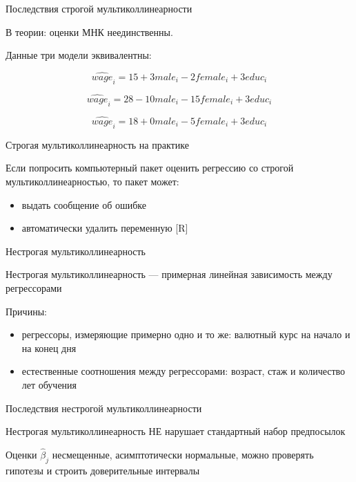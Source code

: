 \documentclass[ignorenonframetext,]{beamer}
\begin{document}
\begin{frame}{Последствия строгой мультиколлинеарности}

В теории: оценки МНК неединственны.

Данные три модели эквивалентны:

\[
\widehat{wage}_i=15 + 3 male_i -2 female_i + 3 educ_i 
\]

\[
\widehat{wage}_i=28 -10 male_i -15 female_i + 3 educ_i 
\]

\[
\widehat{wage}_i=18 + 0 male_i -5 female_i + 3 educ_i 
\]

\end{frame}

\begin{frame}{Строгая мультиколлинеарность на практике}

Если попросить компьютерный пакет оценить регрессию со строгой
мультиколлинеарностью, то пакет может:

\begin{itemize}
\itemsep1pt\parskip0pt
\item
  выдать сообщение об ошибке
\item
  автоматически удалить переменную {[}R{]}
\end{itemize}

\end{frame}

\begin{frame}{Нестрогая мультиколлинеарность}

Нестрогая мультиколлинеарность --- примерная линейная зависимость между
регрессорами

Причины:

\begin{itemize}
\itemsep1pt\parskip0pt
\item
  регрессоры, измеряющие примерно одно и то же: валютный курс на начало
  и на конец дня
\item
  естественные соотношения между регрессорами: возраст, стаж и
  количество лет обучения
\end{itemize}

\end{frame}

\begin{frame}{Последствия нестрогой мультиколлинеарности}

Нестрогая мультиколлинеарность НЕ нарушает стандартный набор предпосылок

Оценки \(\hat{\beta}_j\) несмещенные, асимптотически нормальные, можно
проверять гипотезы и строить доверительные интервалы

\end{frame}
\end{document}
